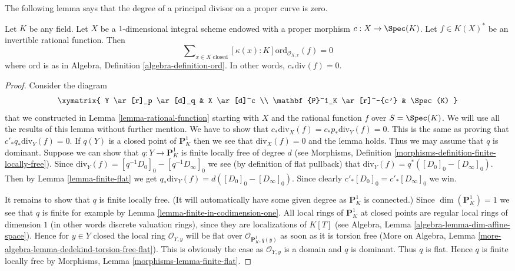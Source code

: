 \noindent
The following lemma says that the degree of a principal divisor on
a proper curve is zero.

\begin{lemma}
\label{lemma-curve-principal-divisor}
Let $K$ be any field. Let $X$ be a $1$-dimensional integral scheme
endowed with a proper morphism $c : X \to \Spec(K)$.
Let $f \in K(X)^*$ be an invertible rational function.
Then
$$
\sum\nolimits_{x \in X \text{ closed}}
[\kappa(x) : K] \text{ord}_{\mathcal{O}_{X, x}}(f)
=
0
$$
where $\text{ord}$ is as in
Algebra, Definition \ref{algebra-definition-ord}.
In other words, $c_*\text{div}(f) = 0$.
\end{lemma}

\begin{proof}
Consider the diagram
$$
\xymatrix{
Y \ar[r]_p \ar[d]_q & X \ar[d]^c \\
\mathbf{P}^1_K \ar[r]^-{c'} & \Spec(K)
}
$$
that we constructed in Lemma \ref{lemma-rational-function}
starting with $X$ and the rational function $f$ over $S = \Spec(K)$.
We will use all the results of this lemma without further mention.
We have to show that $c_*\text{div}_X(f) = c_*p_*\text{div}_Y(f) = 0$.
This is the same as proving that $c'_*q_*\text{div}_Y(f) = 0$.
If $q(Y)$ is a closed point of $\mathbf{P}^1_K$ then we
see that $\text{div}_X(f) = 0$ and the lemma holds.
Thus we may assume that $q$ is dominant.
Suppose we can show that $q : Y \to \mathbf{P}^1_K$ is finite
locally free of degree $d$ (see
Morphisms, Definition \ref{morphisms-definition-finite-locally-free}).
Since $\text{div}_Y(f) = [q^{-1}D_0]_0 - [q^{-1}D_\infty]_0$
we see (by definition of flat pullback) that
$\text{div}_Y(f) = q^*([D_0]_0 - [D_\infty]_0)$.
Then by Lemma \ref{lemma-finite-flat} we get
$q_*\text{div}_Y(f) = d([D_0]_0 - [D_\infty]_0)$.
Since clearly $c'_*[D_0]_0 = c'_*[D_\infty]_0$ we win.

\medskip\noindent
It remains to show that $q$ is finite locally free.
(It will automatically have some given degree as $\mathbf{P}^1_K$
is connected.)
Since $\dim(\mathbf{P}^1_K) = 1$ we see that $q$ is finite for example
by Lemma \ref{lemma-finite-in-codimension-one}.
All local rings of $\mathbf{P}^1_K$ at
closed points are regular local rings of dimension $1$
(in other words discrete valuation rings), since they are
localizations of $K[T]$ (see
Algebra, Lemma \ref{algebra-lemma-dim-affine-space}).
Hence for $y\in Y$ closed the local ring $\mathcal{O}_{Y, y}$
will be flat over $\mathcal{O}_{\mathbf{P}^1_K, q(y)}$ as soon as
it is torsion free (More on Algebra, Lemma
\ref{more-algebra-lemma-dedekind-torsion-free-flat}).
This is obviously the case as
$\mathcal{O}_{Y, y}$ is a domain and $q$ is dominant.
Thus $q$ is flat. Hence $q$ is finite locally free by
Morphisms, Lemma \ref{morphisms-lemma-finite-flat}.
\end{proof}





